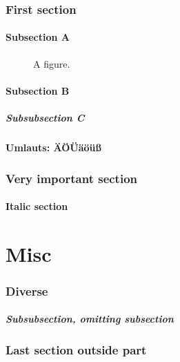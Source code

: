 \documentclass{article}
\begin{document}
\section{First section}
\subsection{Subsection A}
\begin{figure}
  \hypertarget{fig}{}%
  A figure.
\end{figure}
\subsection{Subsection B}
\subsubsection{Subsubsection C}
\subsection{Umlauts: \"A\"O\"U\"a\"o\"u\ss}
\newpage
{}
\section{Very important section}
\subsection{Italic section}
\part{Misc}
\section{Diverse}
\subsubsection{Subsubsection, omitting subsection}
\section{Last section outside part}
\end{document}
